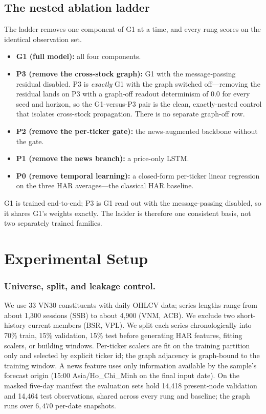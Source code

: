 \documentclass[runningheads]{llncs}
\newcommand{\nval}{14{,}418}
\newcommand{\ntest}{14{,}464}
\newcommand{\ntick}{33}
\begin{document}
\subsection{The nested ablation ladder}
The ladder removes one component of G1 at a time, and every rung scores on the identical observation set.
\begin{itemize}
\item \textbf{G1 (full model):} all four components.
\item \textbf{P3 (remove the cross-stock graph):} G1 with the message-passing residual disabled. P3 is
\emph{exactly} G1 with the graph switched off---removing the residual lands on P3 with a graph-off readout
determinism of $0.0$ for every seed and horizon, so the G1-versus-P3 pair is the clean, exactly-nested
control that isolates cross-stock propagation. There is no separate graph-off row.
\item \textbf{P2 (remove the per-ticker gate):} the news-augmented backbone without the gate.
\item \textbf{P1 (remove the news branch):} a price-only LSTM.
\item \textbf{P0 (remove temporal learning):} a closed-form per-ticker linear regression on the three HAR
averages---the classical HAR baseline.
\end{itemize}
G1 is trained end-to-end; P3 is G1 read out with the message-passing disabled, so it shares G1's weights
exactly. The ladder is therefore one consistent basis, not two separately trained families.

\section{Experimental Setup}
\label{sec:setup}

\subsubsection{Universe, split, and leakage control.}
We use \ntick{} VN30 constituents with daily OHLCV data; series lengths range from about 1{,}300 sessions
(SSB) to about 4{,}900 (VNM, ACB). We exclude two short-history current members (BSR, VPL). We split each
series chronologically into 70\% train, 15\% validation, 15\% test before generating HAR features, fitting
scalers, or building windows. Per-ticker scalers are fit on the training partition only and selected by
explicit ticker id; the graph adjacency is graph-bound to the training window. A news feature uses only
information available by the sample's forecast origin (15:00 Asia/Ho\_Chi\_Minh on the final input date).
On the masked five-day manifest the evaluation sets hold \nval{} present-node validation and \ntest{} test
observations, shared across every rung and baseline; the graph runs over $6{,}470$ per-date snapshots.
\end{document}
